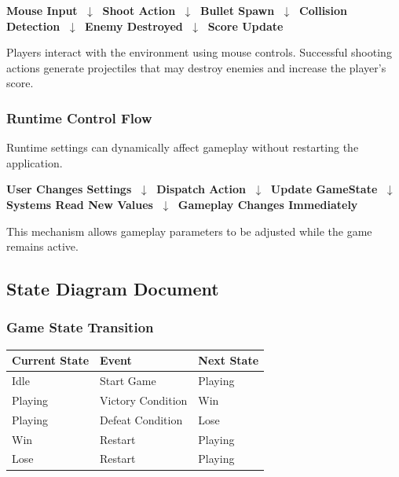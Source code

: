 \documentclass[11pt,a4paper]{article}
\begin{document}
\begin{center}
\textbf{Mouse Input} $\;\downarrow\;$
\textbf{Shoot Action} $\;\downarrow\;$
\textbf{Bullet Spawn} $\;\downarrow\;$
\textbf{Collision Detection} $\;\downarrow\;$
\textbf{Enemy Destroyed} $\;\downarrow\;$
\textbf{Score Update}
\end{center}

Players interact with the environment using mouse controls. Successful shooting
actions generate projectiles that may destroy enemies and increase the player's
score.

\subsubsection{Runtime Control Flow}
Runtime settings can dynamically affect gameplay without restarting the
application.

\begin{center}
\textbf{User Changes Settings} $\;\downarrow\;$
\textbf{Dispatch Action} $\;\downarrow\;$
\textbf{Update GameState} $\;\downarrow\;$
\textbf{Systems Read New Values} $\;\downarrow\;$
\textbf{Gameplay Changes Immediately}
\end{center}

This mechanism allows gameplay parameters to be adjusted while the game remains
active.

\subsection{State Diagram Document}

\subsubsection{Game State Transition}

\begin{center}
\begin{tabular}{lll}
  \toprule
  \textbf{Current State} & \textbf{Event} & \textbf{Next State} \\
  \midrule
  Idle    & Start Game        & Playing \\
  Playing & Victory Condition & Win \\
  Playing & Defeat Condition  & Lose \\
  Win     & Restart           & Playing \\
  Lose    & Restart           & Playing \\
  \bottomrule
\end{tabular}
\end{center}
\end{document}
